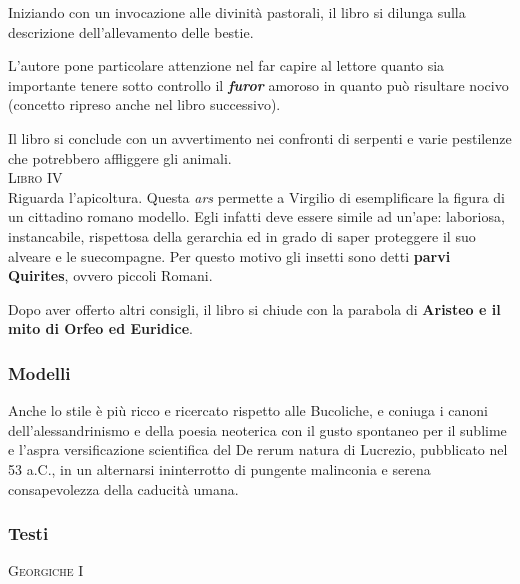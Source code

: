 \documentclass[10pt,a4paper]{article}
\begin{document}
	Iniziando con un invocazione alle divinità pastorali, il libro si dilunga sulla descrizione dell'allevamento delle bestie.
	
	L'autore pone particolare attenzione nel far capire al lettore quanto sia importante tenere sotto controllo il \textit{\textbf{furor}} amoroso in quanto può risultare nocivo (concetto ripreso anche nel libro successivo). 
	
	Il libro si conclude con un avvertimento nei confronti di serpenti e varie pestilenze che potrebbero affliggere gli animali.\\
	
	\textsc{Libro IV}\\
	
	Riguarda l'apicoltura. Questa \textit{ars} permette a Virgilio di esemplificare la figura di un cittadino romano modello. Egli infatti deve essere simile ad un'ape: laboriosa, instancabile, rispettosa della gerarchia ed in grado di saper proteggere il suo alveare e le suecompagne. Per questo motivo gli insetti sono detti \textbf{parvi Quirites}, ovvero piccoli Romani.
	
	Dopo aver offerto altri consigli, il libro si chiude con la parabola di \textbf{Aristeo e il mito di Orfeo ed Euridice}.
	
	\subsubsection*{Modelli}
	
	Anche lo stile è più ricco e ricercato rispetto alle Bucoliche, e coniuga i canoni dell'alessandrinismo e della poesia neoterica con il gusto spontaneo per il sublime e l'aspra versificazione scientifica del De rerum natura di Lucrezio, pubblicato nel 53 a.C., in un alternarsi ininterrotto di pungente malinconia e serena consapevolezza della caducità umana.
	
	\subsubsection*{Testi}
	
	\textsc{Georgiche I}
	
	
	
\end{document}
